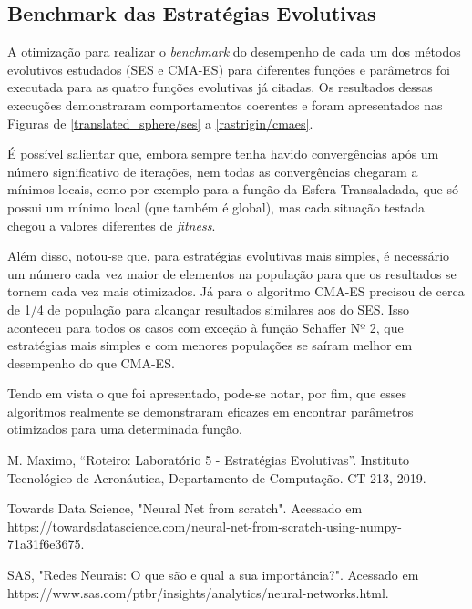 \documentclass[conference]{IEEEtran}
\begin{document}
\subsection{Benchmark das Estratégias Evolutivas}

A otimização para realizar o \textit{benchmark} do desempenho de cada um dos métodos evolutivos estudados (SES e CMA-ES) para diferentes funções e parâmetros foi executada para as quatro funções evolutivas já citadas. Os resultados dessas execuções demonstraram comportamentos coerentes e foram apresentados nas Figuras de \ref{translated_sphere/ses} a \ref{rastrigin/cmaes}.

É possível salientar que, embora sempre tenha havido convergências após um número significativo de iterações, nem todas as convergências chegaram a mínimos locais, como por exemplo para a função da Esfera Transaladada, que só possui um mínimo local (que também é global), mas cada situação testada chegou a valores diferentes de \textit{fitness}.

Além disso, notou-se que, para estratégias evolutivas mais simples, é necessário um número cada vez maior de elementos na população para que os resultados se tornem cada vez mais otimizados. Já para o algoritmo CMA-ES precisou de cerca de 1/4 de população para alcançar resultados similares aos do SES. Isso aconteceu para todos os casos com exceção à função Schaffer Nº 2, que estratégias mais simples e com menores populações se saíram melhor em desempenho do que CMA-ES.

Tendo em vista o que foi apresentado, pode-se notar, por fim, que esses algoritmos realmente se demonstraram eficazes em encontrar parâmetros otimizados para uma determinada função.

\begin{thebibliography}{00}
 M. Maximo, ``Roteiro: Laboratório 5 - Estratégias Evolutivas''. Instituto Tecnológico de Aeronáutica, Departamento de Computação. CT-213, 2019.

 Towards Data Science, "Neural Net from scratch". Acessado em https://towardsdatascience.com/neural-net-from-scratch-using-numpy-71a31f6e3675.

 SAS, "Redes Neurais: O que são e qual a sua importância?". Acessado em https://www.sas.com/pt\underline{\space}br/insights/analytics/neural-networks.html.

\end{thebibliography}
\end{document}

